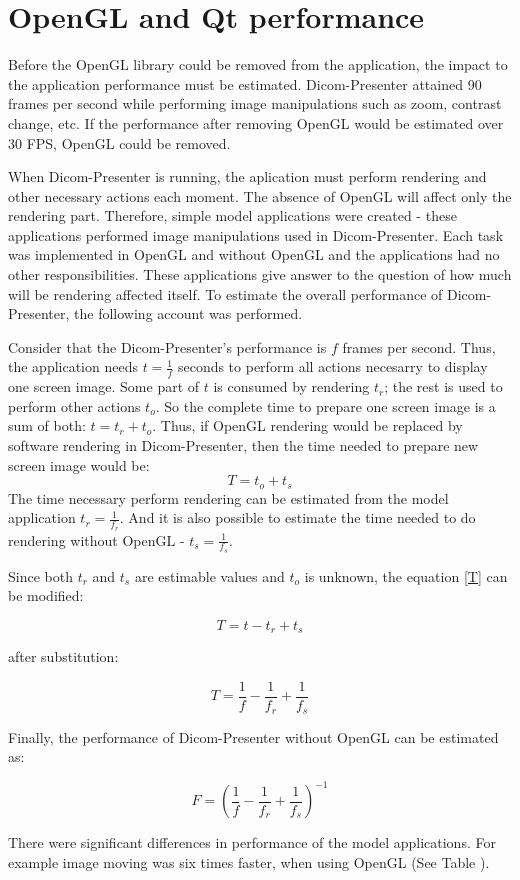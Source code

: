 \section{OpenGL and Qt performance}
Before the OpenGL library could be removed from the application, the impact to the application performance must be estimated. Dicom-Presenter attained 90 frames per second while performing image manipulations such as zoom, contrast change, etc. If the performance after removing OpenGL would be estimated over 30 FPS, OpenGL could be removed. 

When Dicom-Presenter is running, the aplication must perform rendering and other necessary actions each moment. The absence of OpenGL will affect only the rendering part. Therefore, simple model applications were created - these applications performed image manipulations used in Dicom-Presenter. Each task was implemented in OpenGL and without OpenGL and the applications had no other responsibilities. These applications give answer to the question of how much will be rendering affected itself. To estimate the overall performance of Dicom-Presenter, the following account was performed.
 
Consider that the Dicom-Presenter's performance is $f$ frames per second. Thus, the application needs $t=\frac{1}{f}$ seconds to perform all actions necesarry to display one screen image.  Some part of $t$ is consumed by rendering $t_{r}$; the rest is used to perform other actions $t_{o}$. So the complete time to prepare one screen image is a sum of both: $t=t_{r}+t_{o}$. Thus, if OpenGL rendering would be replaced by software rendering in Dicom-Presenter, then the time needed to prepare new screen image would be:
\begin{equation} \label{T}
T=t_{o} + t_{s}
\end{equation} 
The time necessary perform rendering can be estimated from the model application $t_{r} = \frac{1}{f_{r}}$. And it is also possible to estimate the time needed to do rendering without OpenGL - $t_{s} = \frac{1}{f_{s}}$.

Since both $t_{r}$ and $t_{s}$ are estimable values and $t_{o}$ is unknown, the equation \ref{T} can be modified:

\begin{equation} \label{T}
T = t - t_{r} + t_{s}
\end{equation} 

after substitution:

\begin{equation} \label{T}
T = \frac{1}{f} - \frac{1}{f_{r}} + \frac{1}{f_{s}}
\end{equation} 

Finally, the performance of Dicom-Presenter without OpenGL can be estimated as:

\begin{equation} \label{estimate}
F = \left(\frac{1}{f} - \frac{1}{f_{r}} + \frac{1}{f_{s}}\right)^{-1}
\end{equation}

There were significant differences in performance of the model applications. For example image moving was six times faster, when using OpenGL (See Table ).




